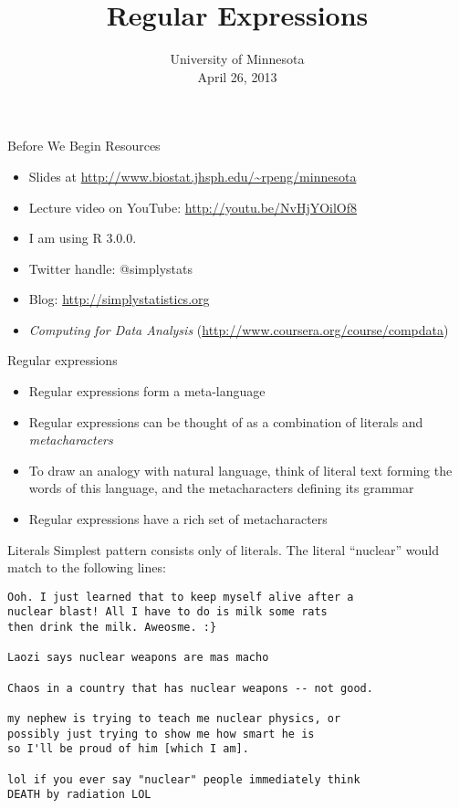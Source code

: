 \documentclass[aspectratio=169]{beamer}
\title{Regular Expressions}
\date{University of Minnesota\\April 26, 2013}
\begin{document}
\begin{frame}
  \titlepage
\end{frame}

\begin{frame}{Before We Begin}
Resources
\begin{itemize}
\item Slides at \url{http://www.biostat.jhsph.edu/~rpeng/minnesota}
\item Lecture video on YouTube: \url{http://youtu.be/NvHjYOilOf8}
\item I am using R 3.0.0.
\item Twitter handle: @simplystats
\item Blog: \url{http://simplystatistics.org}
\item \textit{Computing for Data Analysis} (\url{http://www.coursera.org/course/compdata})
\end{itemize}
\end{frame}


\begin{frame}{Regular expressions}
\begin{itemize}
\item
Regular expressions form a meta-language
\item
Regular expressions can be thought of as a combination of literals and
\textit{metacharacters}
\item
To draw an analogy with natural language, think of literal text
forming the words of this language, and the metacharacters defining
its grammar
\item
Regular expressions have a rich set of metacharacters
\end{itemize}

\end{frame}

\begin{frame}[fragile]{Literals}
Simplest pattern consists only of literals.  The literal ``nuclear''
would match to the following lines:
\begin{verbatim}
Ooh. I just learned that to keep myself alive after a 
nuclear blast! All I have to do is milk some rats 
then drink the milk. Aweosme. :}

Laozi says nuclear weapons are mas macho

Chaos in a country that has nuclear weapons -- not good.

my nephew is trying to teach me nuclear physics, or 
possibly just trying to show me how smart he is 
so I'll be proud of him [which I am].

lol if you ever say "nuclear" people immediately think 
DEATH by radiation LOL
\end{verbatim}
\end{frame}
\end{document}
